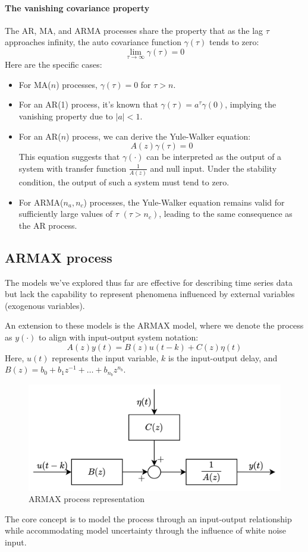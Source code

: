 \paragraph*{The vanishing covariance property}
The AR, MA, and ARMA processes share the property that as the lag $\tau$ approaches infinity, the auto covariance function $\gamma(\tau)$ tends to zero:
\[\lim_{\tau \rightarrow \infty} \gamma(\tau)=0\]
Here are the specific cases:
\begin{itemize}
    \item For MA($n$) processes, $\gamma(\tau) = 0$ for $\tau > n$.
    \item For an AR(1) process, it's known that $\gamma(\tau)=a^\tau\gamma(0)$, implying the vanishing property due to $\left\lvert a \right\rvert  < 1$.
    \item For an AR($n$) process, we can derive the Yule-Walker equation:
        \[A(z)\gamma(\tau)=0\]
        This equation suggests that $\gamma(\cdot)$ can be interpreted as the output of a system with transfer function $\frac{1}{A(z)}$ and null input.
        Under the stability condition, the output of such a system must tend to zero.
    \item For ARMA($n_a, n_c$) processes, the Yule-Walker equation remains valid for sufficiently large values of $\tau$ $(\tau > n_c)$, leading to the same consequence as the AR process.
\end{itemize}

\subsection{ARMAX process}
The models we've explored thus far are effective for describing time series data but lack the capability to represent phenomena influenced by external variables (exogenous variables).

An extension to these models is the ARMAX model, where we denote the process as $y(\cdot)$ to align with input-output system notation:
\[A(z)y(t)=B(z)u(t-k)+C(z)\eta(t)\]
Here, $u(t)$ represents the input variable, $k$ is the input-output delay, and $B(z)=b_0+b_1z^{-1}+\dots+b_{n_b}z^{n_b}$. 
\begin{figure}[H]
    \centering
    \includegraphics[width=0.5\linewidth]{images/armax.png} 
    \caption{ARMAX process representation}
\end{figure}
The core concept is to model the process through an input-output relationship while accommodating model uncertainty through the influence of white noise input.

